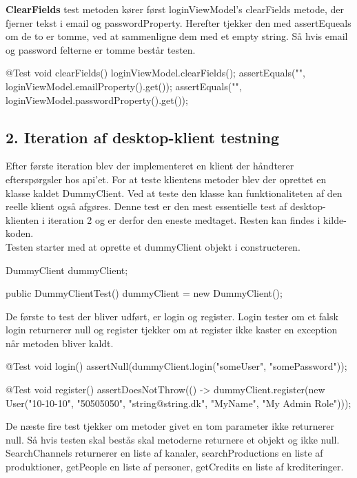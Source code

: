 \textbf{ClearFields} test metoden kører først loginViewModel’s clearFields metode, der fjerner tekst i email og passwordProperty. Herefter tjekker den med assertEqueals om de to er tomme, ved at sammenligne dem med et empty string. Så hvis email og password felterne er tomme består testen.\\

\begin{code}[caption=LoginViewModel.java, firstnumber=49]
@Test
void clearFields() {
    loginViewModel.clearFields();
    assertEquals("", loginViewModel.emailProperty().get());
    assertEquals("", loginViewModel.passwordProperty().get());
}
\end{code}

\subsection{2. Iteration af desktop-klient testning}
Efter første iteration blev der implementeret en klient der håndterer efterspørgsler hos api'et. For at teste klientens metoder blev der oprettet en klasse kaldet DummyClient. Ved at teste den klasse kan funktionaliteten af den reelle klient også afgøres. Denne test er den mest essentielle test af desktop-klienten i iteration 2 og er derfor den eneste medtaget. Resten kan findes i kilde-koden. \\

Testen starter med at oprette et dummyClient objekt i constructeren.

\begin{code}[caption=DummyClientTest.java, firstnumber=14]
DummyClient dummyClient;

public DummyClientTest() {
    dummyClient = new DummyClient();
}
\end{code}

De første to test der bliver udført, er login og register. Login tester om et falsk login returnerer null og register tjekker om at register ikke kaster en exception når metoden bliver kaldt.

\begin{code}[caption=DummyClientTest.java, firstnumber=20]
@Test
void login() {
    assertNull(dummyClient.login("someUser", "somePassword"));
}

@Test
void register() {
    assertDoesNotThrow(() -> dummyClient.register(new User("10-10-10", "50505050", "string@string.dk",
            "MyName", "My Admin Role")));
}
\end{code}

De næste fire test tjekker om metoder givet en tom parameter ikke returnerer null. Så hvis testen skal bestås skal metoderne returnere et objekt og ikke null. SearchChannels returnerer en liste af kanaler, searchProductions en liste af produktioner, getPeople en liste af personer, getCredits en liste af krediteringer.

